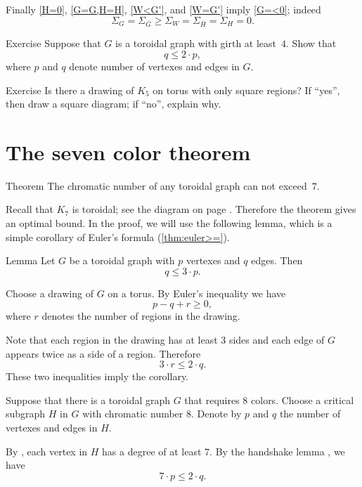 Finally \ref{H=0}, \ref{G=G,H=H}, \ref{W<G'}, and \ref{W=G'} imply \ref{G=<0};
indeed
\[\Sigma_G=\Sigma_{\bar G}\ge \Sigma_W=\Sigma_{\bar H}=\Sigma_H=0.\]
\qedsf


\begin{thm}{Exercise}
Suppose that $G$ is a toroidal graph with girth at least~$4$.
Show that 
\[q\le 2\cdot p,\]
where $p$ and $q$ denote number of vertexes and edges in $G$.
\end{thm}

\begin{thm}{Exercise}
Is there a drawing of $K_5$ on torus with only square regions?
If ``yes'', then draw a square diagram; if ``no'', explain why.
\end{thm}

\section*{The seven color theorem}

\begin{thm}{Theorem}\label{thm:7-colors}
The chromatic number of any toroidal graph can not exceed~$7$.
\end{thm}

Recall that $K_7$ is toroidal; see the diagram on page \pageref{K5-toroidal}.
Therefore the theorem gives an optimal bound.
In the proof, we will use the following lemma, which is a simple corollary of Euler's formula (\ref{thm:euler>=}).

\begin{thm}{Lemma}\label{cor:q=<3p}
Let $G$ be a toroidal graph with $p$ vertexes and $q$ edges.
Then 
\[q\le 3\cdot p.\]

\end{thm}

Choose a drawing of $G$ on a torus.
By Euler's inequality we have
\[p-q+r\ge 0,\]
where $r$ denotes the number of regions in the drawing.

Note that each region in the drawing has at least $3$ sides
and each edge of $G$ appears twice as a side of a region.
Therefore 
\[3\cdot r\le 2\cdot q.\]
These two inequalities imply the corollary.
\qeds


Suppose that there is a toroidal graph $G$ that requires $8$ colors.
Choose a critical subgraph $H$ in $G$ with chromatic number 8.
Denote by $p$ and $q$ the number of vertexes and edges in $H$.

By \cite[Theorem 2.1.3]{hartsfield-ringel}, each vertex in $H$ has a degree of at least $7$.
By the handshake lemma \cite[Theorem 1.1.1]{hartsfield-ringel}, we have 
\[7\cdot p\le 2\cdot q.\]

